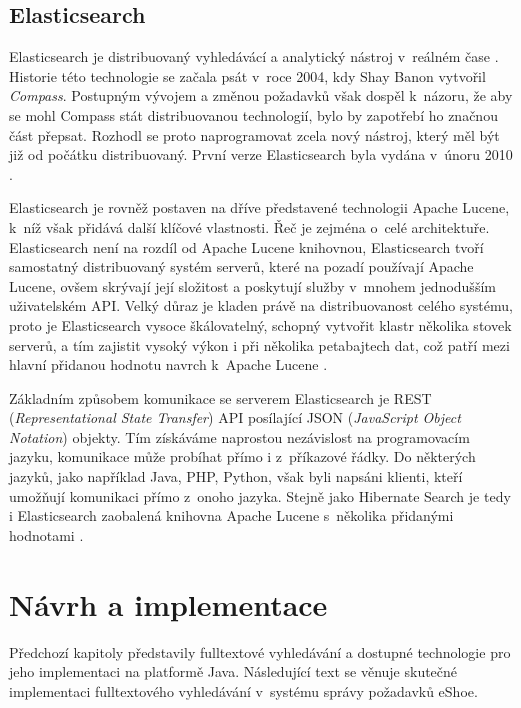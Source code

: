 \documentclass[11pt,oneside]{fithesis2}
\begin{document}
\section{Elasticsearch}
\label{ElasticsearchChapter}
Elasticsearch je distribuovaný vyhledávácí a analytický nástroj v~reálném čase \cite{ElasticsearchDefinitiveGuide}. Historie této technologie se začala psát v~roce 2004, kdy Shay Banon vytvořil \emph{Compass}. Postupným vývojem a změnou požadavků však dospěl k~názoru, že aby se mohl Compass stát distribuovanou technologií, bylo by zapotřebí ho značnou část přepsat. Rozhodl se proto naprogramovat zcela nový nástroj, který měl být již od počátku distribuovaný. První verze Elasticsearch byla vydána v~únoru 2010 \cite{ElasticsearchWiki}.

Elasticsearch je rovněž postaven na dříve představené technologii Apache Lucene, k~níž však přidává další klíčové vlastnosti. Řeč je zejména o~celé architektuře. Elasticsearch není na rozdíl od Apache Lucene knihovnou, Elasticsearch tvoří samostatný distribuovaný systém serverů, které na pozadí používají Apache Lucene, ovšem skrývají její složitost a poskytují služby v~mnohem jednodušším uživatelském API. Velký důraz je kladen právě na distribuovanost celého systému, proto je Elasticsearch vysoce škálovatelný, schopný vytvořit klastr několika stovek serverů, a tím zajistit vysoký výkon i při několika petabajtech dat, což patří mezi hlavní přidanou hodnotu navrch k~Apache Lucene \cite{ElasticsearchDefinitiveGuide}.

Základním způsobem komunikace se serverem Elasticsearch je REST (\emph{Representational State Transfer}) API posílající JSON (\emph{JavaScript Object Notation}) objekty. Tím získáváme naprostou nezávislost na programovacím jazyku, komunikace může probíhat přímo i z~příkazové řádky. Do některých jazyků, jako například Java, PHP, Python, však byli napsáni klienti, kteří umožňují komunikaci přímo z~onoho jazyka. Stejně jako Hibernate Search je tedy i Elasticsearch zaobalená knihovna Apache Lucene s~několika přidanými hodnotami \cite{ElasticsearchDefinitiveGuide}. 

\chapter{Návrh a implementace}
Předchozí kapitoly představily fulltextové vyhledávání a dostupné technologie pro jeho implementaci na platformě Java. Následující text se věnuje skutečné implementaci fulltextového vyhledávání v~systému správy požadavků eShoe. 
\end{document}
